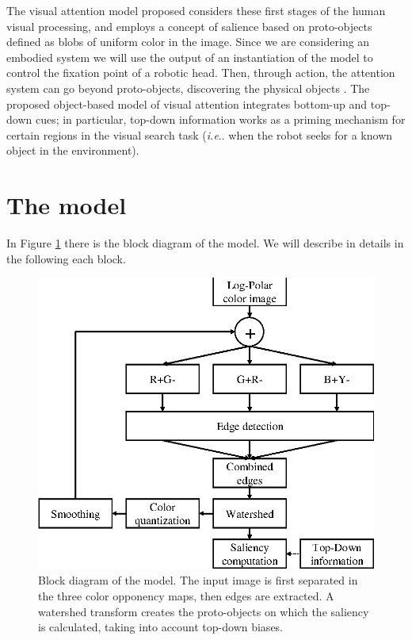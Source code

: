 \documentclass{llncs}
\makeatletter
\DeclareRobustCommand\onedot{\futurelet\@let@token\@onedot}
\def\@onedot{\ifx\@let@token.\else.\null\fi\xspace}
\def\ie{\emph{i.e}\onedot} \def\Ie{\emph{I.e}\onedot}
\makeatother
\begin{document}
The visual attention model proposed considers
these first stages of the human visual processing, and
employs a concept of salience based on proto-objects
defined as blobs of uniform color in the
image. Since we are considering an embodied system
we will use the output of an instantiation of the model
to control the fixation point of a robotic head.
Then, through action, the attention system can go
beyond proto-objects, discovering the physical objects \cite{MettaF03,Orabona07}.
The proposed object-based model of visual
attention integrates bottom-up and top-down cues;
in particular, top-down information works as a priming
mechanism for certain regions in the visual search task
(\ie when the robot seeks for a known object in the environment).



\section{The model}
\label{sec:att_model}
In Figure \ref{fig:model_diagram} there is the block diagram of the model.
We will describe in details in the following each block.

\begin{figure}[]
  \begin{center}
    \includegraphics[width=0.6\linewidth]{./figs/attention/schema}
    \caption{Block diagram of the model. The input image is first separated in
     the three color opponency maps, then edges are extracted. A watershed transform
     creates the proto-objects on which the saliency is calculated,
     taking into account top-down biases.}
     \label{fig:model_diagram}
  \end{center}
\end{figure}
\end{document}

